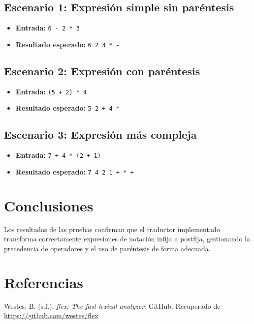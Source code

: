 \documentclass{article}
\begin{document}
\subsection*{Escenario 1: Expresión simple sin paréntesis}

\begin{itemize}
    \item \textbf{Entrada:} \texttt{6 - 2 * 3}
    \item \textbf{Resultado esperado:} \texttt{6 2 3 * -}
\end{itemize}

\subsection*{Escenario 2: Expresión con paréntesis}

\begin{itemize}
    \item \textbf{Entrada:} \texttt{(5 + 2) * 4}
    \item \textbf{Resultado esperado:} \texttt{5 2 + 4 *}
\end{itemize}

\subsection*{Escenario 3: Expresión más compleja}

\begin{itemize}
    \item \textbf{Entrada:} \texttt{7 + 4 * (2 + 1)}
    \item \textbf{Resultado esperado:} \texttt{7 4 2 1 + * +}
\end{itemize}

\section*{Conclusiones}

Los resultados de las pruebas confirman que el traductor implementado transforma correctamente expresiones de notación infija a postfija, gestionando la precedencia de operadores y el uso de paréntesis de forma adecuada. 


\section{Referencias}
\renewcommand{\refname}{}

\begin{thebibliography}{9}

 \label{ref:vidIntro} Westes, B. (s.f.). \textit{flex: The fast lexical analyzer}. GitHub. Recuperado de \url{https://github.com/westes/flex}


\end{thebibliography}
\end{document}

